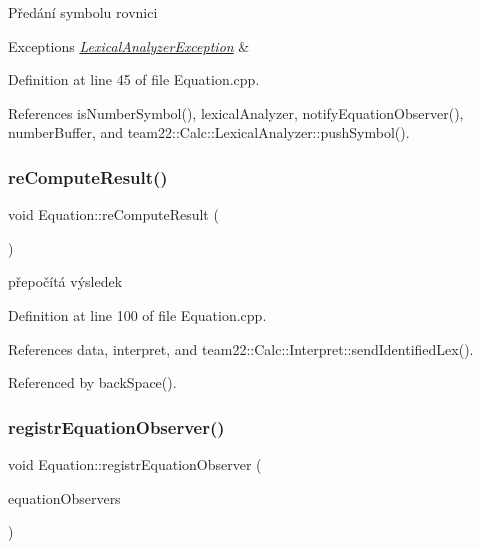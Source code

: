 Předání symbolu rovnici 
\begin{DoxyExceptions}{Exceptions}
{\em \hyperlink{classteam22_1_1_calc_1_1_lexical_analyzer_exception}{Lexical\+Analyzer\+Exception}} & \\
\hline
\end{DoxyExceptions}


Definition at line 45 of file Equation.\+cpp.



References is\+Number\+Symbol(), lexical\+Analyzer, notify\+Equation\+Observer(), number\+Buffer, and team22\+::\+Calc\+::\+Lexical\+Analyzer\+::push\+Symbol().

\mbox{\label{classteam22_1_1_calc_1_1_equation_aba44b10dfb0ece96f3e0279d34cec868}} 
\subsubsection{\texorpdfstring{re\+Compute\+Result()}{reComputeResult()}}
{\footnotesize\ttfamily void Equation\+::re\+Compute\+Result (\begin{DoxyParamCaption}{ }\end{DoxyParamCaption})\hspace{0.3cm}{\ttfamily [private]}}

přepočítá výsledek 

Definition at line 100 of file Equation.\+cpp.



References data, interpret, and team22\+::\+Calc\+::\+Interpret\+::send\+Identified\+Lex().



Referenced by back\+Space().

\mbox{\label{classteam22_1_1_calc_1_1_equation_a705c26d64f67f673e4919494d7e22d4a}} 
\subsubsection{\texorpdfstring{registr\+Equation\+Observer()}{registrEquationObserver()}}
{\footnotesize\ttfamily void Equation\+::registr\+Equation\+Observer (\begin{DoxyParamCaption}\item[{\hyperlink{classteam22_1_1_calc_1_1_equation_observer}{Equation\+Observer} $\ast$}]{equation\+Observers }\end{DoxyParamCaption})}

